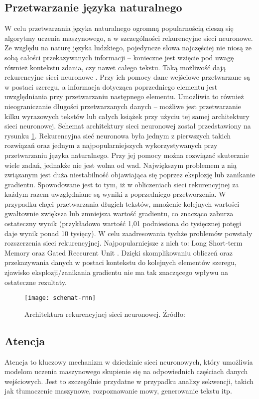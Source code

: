 \subsection{Przetwarzanie języka naturalnego}
W celu przetwarzania języka naturalnego ogromną popularnością cieszą się algorytmy uczenia maszynowego, a w szczególności rekurencyjne sieci neuronowe. Ze względu na naturę języka ludzkiego, pojedyncze słowa najczęściej nie niosą ze sobą całości przekazywanych informacji -- konieczne jest wzięcie pod uwagę również kontekstu zdania, czy nawet całego tekstu. Taką możliwość dają rekurencyjne sieci neuronowe \cite{rnn}. Przy ich pomocy dane wejściowe przetwarzane są w postaci szeregu, a informacja dotycząca poprzedniego elementu jest uwzględniania przy przetwarzaniu następnego elementu. Umożliwia to również nieograniczanie długości przetwarzanych danych -- możliwe jest przetwarzanie kilku wyrazowych tekstów lub całych książek przy użyciu tej samej architektury sieci neuronowej. Schemat architektury sieci neuronowej został przedstawiony na rysunku \ref{fig:schemat-rnn}. Rekurencyjna sieć neuronowa była jednym z pierwszych takich rozwiązań oraz jednym z najpopularniejszych wykorzystywanych przy przetwarzaniu języka naturalnego. Przy jej pomocy można rozwiązać skutecznie wiele zadań, jednakże nie jest wolna od wad. Największym problemem z nią związanym jest duża niestabilność objawiająca się poprzez eksplozję lub zanikanie gradientu. Spowodowane jest to tym, iż w obliczeniach sieci rekurencyjnej za każdym razem uwzględniane są wyniki z poprzedniego przetworzenia. W przypadku chęci przetwarzania długich tekstów, mnożenie kolejnych wartości gwałtownie zwiększa lub zmniejsza wartość gradientu, co znacząco zaburza ostateczny wynik (przykładowo wartość 1,01 podniesiona do tysięcznej potęgi daje wynik ponad 10 tysięcy). W celu zaadresowania tychże problemów powstały rozszerzenia sieci rekurencyjnej. Najpopularniejsze z nich to: Long Short-term Memory \cite{lstm} oraz Gated Reccurent Unit \cite{gru}. Dzięki skomplikowaniu obliczeń oraz przekazywania danych w postaci kontekstu do kolejnych elementów szeregu, zjawisko eksplozji/zanikania gradientu nie ma tak znaczącego wpływu na ostateczne rezultaty.
\begin{figure}[!h]
  \centering
  \texttt{[image: schemat-rnn]}
  \caption{Architektura rekurencyjnej sieci neuronowej. Źródło: \cite{WikipediaEN:RNN}}
  \label{fig:schemat-rnn}
\end{figure}
\subsection{Atencja}
Atencja to kluczowy mechanizm w dziedzinie sieci neuronowych, który umożliwia modelom uczenia maszynowego skupienie się na odpowiednich częściach danych wejściowych. Jest to szczególnie przydatne w przypadku analizy sekwencji, takich jak tłumaczenie maszynowe, rozpoznawanie mowy, generowanie tekstu itp.

